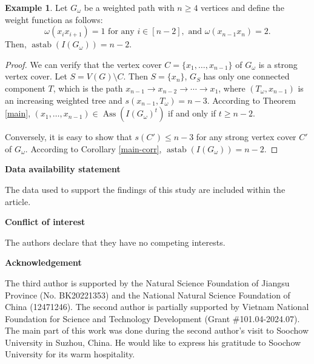 \documentclass[12pt,amscd]{amsart}
\DeclareMathOperator{\ass}{Ass}
\DeclareMathOperator{\astab}{astab}
\theoremstyle{definition}
\newtheorem{exm}[thm]{Example}
\begin{document}
\begin{exm} Let  $G_\omega$ be a weighted path with $n\geqslant 4$  vertices and  define the weight function as follows:
$$\omega(x_ix_{i+1})=1 \text{ for any } i\in [n-2], \text{ and } \omega(x_{n-1}x_n) =2.$$
Then, $\astab(I(G_\omega)) = n-2$.
\end{exm}
\begin{proof} We can verify that the vertex cover $C = \{x_1,\ldots,x_{n-1}\}$ of $G_\omega$ is a strong vertex cover. Let $S =V(G)\setminus C$. Then 
$S = \{x_n\}$,  $G_S$ has only one connected component $T$, which is the path $x_{n-1}\to x_{n-2}\to \cdots\to x_{1}$, where $(T_\omega,x_{n-1})$ is an increasing weighted tree and $s(x_{n-1},T_\omega)=n-3$. According to  Theorem \ref{main},  $(x_1,\ldots,x_{n-1})\in \ass(I(G_\omega)^t)$ if and only if $t\geqslant n-2$.

Conversely, it is easy to show that $s(C') \leqslant n-3$ for any strong vertex cover $C'$ of $G_\omega$. According to Corollary \ref{main-corr}, $\astab(I(G_\omega)) = n-2$.
\end{proof}

\medskip
\hspace{-6mm} {\bf Data availability statement}

The data used to support the findings of this study are included within the article.

\medskip
\hspace{-6mm} {\bf Conflict of interest}

The authors declare that they have no competing interests.



\medskip
\hspace{-6mm} {\bf Acknowledgement}


 \vspace{3mm}
\hspace{-6mm}  
The third author is  supported by the Natural Science Foundation of Jiangsu Province (No. BK20221353) and the National Natural Science Foundation of China (12471246). The second author is partially supported by Vietnam National Foundation for Science and Technology Development (Grant \#101.04-2024.07). The main part of this
work was done during the second author's visit to Soochow University in Suzhou, China.  He would like to express his gratitude to Soochow University for its warm hospitality.
\end{document}
